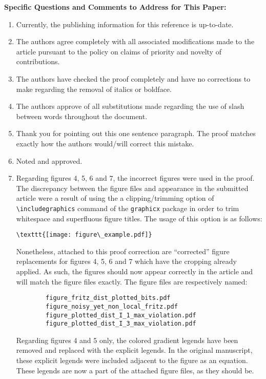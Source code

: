 \documentclass{article}
\begin{document}
    \textbf{Specific Questions and Comments to Address for This Paper:}
    \begin{enumerate}
        \item Currently, the publishing information for this reference is up-to-date.
        \item The authors agree completely with all associated modifications made to the article pursuant to the policy on claims of priority and novelty of contributions.
        \item The authors have checked the proof completely and have no corrections to make regarding the removal of italics or boldface.
        \item The authors approve of all substitutions made regarding the use of slash between words throughout the document.
        \item Thank you for pointing out this one sentence paragraph. The proof matches exactly how the authors would/will correct this mistake.
        \item Noted and approved.
        \item Regarding figures 4, 5, 6 and 7, the incorrect figures were used in the proof. The discrepancy between the figure files and appearance in the submitted article were a result of using the a clipping/trimming option of \verb|\includegraphics| command of the \verb|graphicx| package in order to trim whitespace and superfluous figure titles. The usage of this option is as follows:
        \begin{verbatim}\texttt{[image: figure\_example.pdf]}\end{verbatim}
        Nonetheless, attached to this proof correction are ``corrected'' figure replacements for figures 4, 5, 6 and 7 which have the cropping already applied. As such, the figures should now appear correctly in the article and will match the figure files exactly. The figure files are respectively named:
        \begin{verbatim}
        figure_fritz_dist_plotted_bits.pdf
        figure_noisy_yet_non_local_fritz.pdf
        figure_plotted_dist_I_1_max_violation.pdf
        figure_plotted_dist_I_3_max_violation.pdf
        \end{verbatim}
        Regarding figures 4 and 5 only, the colored gradient legends have been removed and replaced with the explicit legends. In the original manuscript, these explicit legends were included adjacent to the figure as an equation. These legends are now a part of the attached figure files, as they should be.

\end{enumerate}
\end{document}

